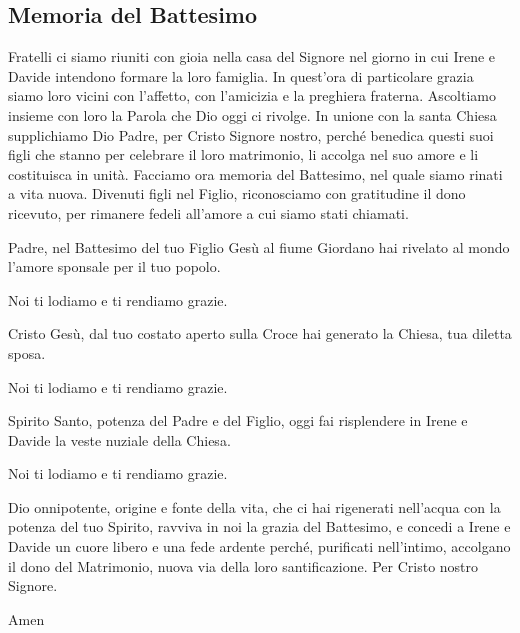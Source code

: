 
\subsection*{Memoria del Battesimo}

\begin{dialoghi}
\item[\sacerdote] Fratelli ci siamo riuniti con gioia nella casa del Signore nel giorno in cui Irene e Davide intendono formare la loro famiglia. In quest'ora di particolare grazia siamo loro vicini con l'affetto, con l'amicizia e la preghiera fraterna. Ascoltiamo insieme con loro la Parola che Dio oggi ci rivolge. In unione con la santa Chiesa supplichiamo Dio Padre, per Cristo Signore nostro, perché benedica questi suoi figli che stanno per celebrare il loro matrimonio, li accolga nel suo amore e li costituisca in unità. Facciamo ora memoria del Battesimo, nel quale siamo rinati a vita nuova. Divenuti figli nel Figlio, riconosciamo con gratitudine il dono ricevuto, per rimanere fedeli all'amore a cui siamo stati chiamati.

Padre, nel Battesimo del tuo Figlio Gesù al fiume Giordano hai rivelato al mondo l'amore sponsale per il tuo popolo.
\item[\tutti] Noi ti lodiamo e ti rendiamo grazie.
\item[\sacerdote] Cristo Gesù, dal tuo costato aperto sulla Croce hai generato la Chiesa, tua diletta sposa.
\item[\tutti] Noi ti lodiamo e ti rendiamo grazie.
\item[\sacerdote] Spirito Santo, potenza del Padre e del Figlio, oggi fai risplendere in Irene e Davide la veste nuziale della Chiesa.
\item[\tutti] Noi ti lodiamo e ti rendiamo grazie.
\item[\sacerdote] Dio onnipotente, origine e fonte della vita, che ci hai rigenerati nell'acqua con la potenza del tuo Spirito, ravviva in noi la grazia del Battesimo, e concedi a Irene e Davide un cuore libero e una fede ardente perché, purificati nell'intimo, accolgano il dono del Matrimonio, nuova via della loro santificazione. Per Cristo nostro Signore.
\item[\tutti] Amen
\end{dialoghi}

\newpage